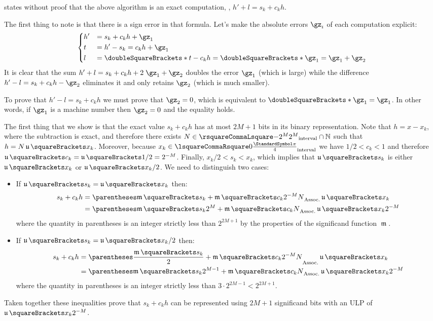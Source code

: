 \documentclass[10pt, a4paper, twoside]{basestyle}
\DeclareMathOperator{\ULP}{\mathfrak u}
\DeclareMathOperator{\mant}{\mathfrak m}
\newcommand{\round}[1]{\doubleSquareBrackets*{#1}}
\begin{document}
\cite{StehléZimmermann2005} states without proof that the above algorithm is an exact computation, \idest, $h' + l = s_k + c_k h$.

The first thing to note is that there is a sign error in that formula.  Let's make the absolute errors $\gz_i$ of each computation explicit:
\[
\begin{dcases}
h' &= s_k + c_k h + \gz_1 \\
t &= h' - s_k = c_k h + \gz_1 \\
l &= \round{t - c_k h} = \round{\gz_1} = \gz_1 + \gz_2
\end{dcases}
\]
It is clear that the sum $h' + l = s_k + c_k h + 2 \; \gz_1 + \gz_2$ doubles the error $\gz_1$ (which is large) while the difference $h' - l = s_k + c_k h - \gz_2$ eliminates it and only retains $\gz_2$ (which is much smaller).

To prove that $h' - l = s_k + c_k h$ we must prove that $\gz_2 = 0$, which is equivalent to $\round{\gz_1} = \gz_1$.  In other words, if $\gz_1$ is a machine number then $\gz_2 = 0$ and the equality holds.

The first thing that we show is that the exact value $s_k + c_k h$ has at most $2 M + 1$ bits in its binary representation.  Note that $h = x - x_k$, where the subtraction is exact, and therefore there exists $N \in \intopen{-2^{M}}{2^M} \Intersection \Naturals$ such that $h = N \ULP\of{x_k}$.  Moreover, because $x_k \in \intclos{0}{\frac{\Pi}{4}}$ we have $1/2 < c_k < 1$ and therefore $\ULP\of{c_k} = \ULP\of{1/2} = 2^{-M}$.  Finally, $x_k / 2 < s_k < x_k$, which implies that $\ULP\of{s_k}$ is either $\ULP\of{x_k}$ or $\ULP\of{x_k} / 2$.  We need to distinguish two cases:

\begin{itemize} 
\item If $\ULP\of{s_k} = \ULP\of{x_k}$ then:
\begin{align*}
s_k + c_k h &= \pa{\mant\of{s_k} + \mant\of{c_k} 2^{-M} N} \ULP\of{x_k} \\
&= \pa{\mant\of{s_k} 2^M + \mant\of{c_k} N} \ULP\of{x_k} 2^{-M}
\end{align*}
where the quantity in parentheses is an integer strictly less than $2^{2 M + 1}$ by the properties of the significand function $\mant$.
\item If $\ULP\of{s_k} = \ULP\of{x_k} / 2$ then:
\begin{align*}
s_k + c_k h &= \pa{\frac{\mant\of{s_k}}{2} + \mant\of{c_k} 2^{-M} N} \ULP\of{x_k} \\
&= \pa{\mant\of{s_k} 2^{M - 1} + \mant\of{c_k} N} \ULP\of{x_k} 2^{-M}
\end{align*}
where the quantity in parentheses is an integer strictly less than $3 \cdot 2^{2 M - 1} < 2^{2 M + 1}$.
\end{itemize}
Taken together these inequalities prove that $s_k + c_k h$ can be represented using $2 M + 1$ significand bits with an ULP of $\ULP\of{x_k} 2^{-M}$.
\end{document}
